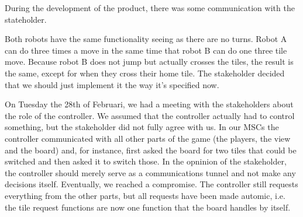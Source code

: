 During the development of the product, there was some communication with the stateholder.










\bigskip
Both robots have the same functionality seeing as there are no turns. Robot A can do three times a move in the same time that robot B can do one three tile move. Because robot B does not jump but actually crosses the tiles, the result is the same, except for when they cross their home tile. The stakeholder decided that we should just implement it the way it's specified now.

On Tuesday the 28th of Februari, we had a meeting with the stakeholders about the role of the controller. We assumed that the controller actually had to control something, but the stakeholder did not fully agree with us. In our MSCs the controller communicated with all other parts of the game (the players, the view and the board) and, for instance, first asked the board for two tiles that could be switched and then asked it to switch those. In the opninion of the stakeholder, the controller should merely serve as a communications tunnel and not make any decisions itself. Eventually, we reached a compromise. The controller still requests everything from the other parts, but all requests have been made automic, i.e. the tile request functions are now one function that the board handles by itself.
